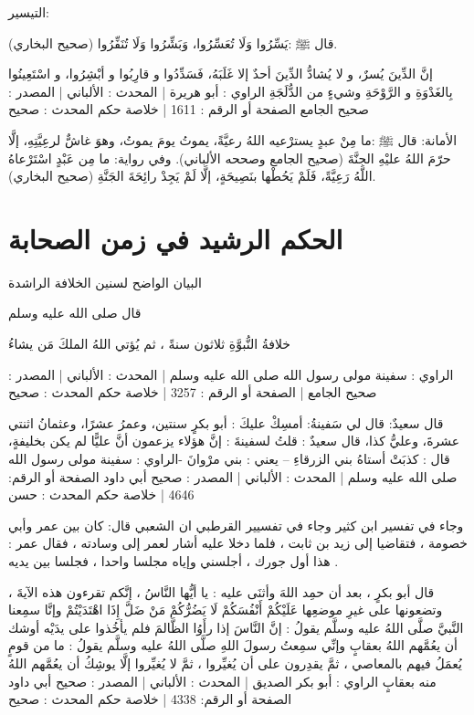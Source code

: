 التيسير:

قال ﷺ :يَسِّرُوا وَلَا تُعَسِّرُوا، وَبَشِّرُوا وَلَا تُنَفِّرُوا {\footnotesize (صحيح البخاري)}.

إنَّ الدِّينَ يُسرٌ، و لا يُشادُّ الدِّينَ أحدٌ إلا غَلَبَهُ، فَسَدِّدُوا و قارِبُوا و أبْشِرُوا، و اسْتَعِينُوا بِالغَدْوَةِ و الرَّوْحَةِ وشيءٍ من الدُّلَجَةِ
الراوي : أبو هريرة | المحدث : الألباني | المصدر : صحيح الجامع
الصفحة أو الرقم : 1611 | خلاصة حكم المحدث : صحيح 


الأمانة:
قال ﷺ :ما مِنْ عبدٍ يسترْعيه اللهُ رعيَّةً، يموتُ يومَ يموتُ، وهوَ غاشٌّ لرعِيَّتِهِ، إلَّا حرّمَ اللهُ عليْهِ الجنَّةَ {\footnotesize (صحيح الجامع وصححه الألباني)}. وفي رواية: ما مِن عَبْدٍ اسْتَرْعاهُ اللَّهُ رَعِيَّةً، فَلَمْ يَحُطْها بنَصِيحَةٍ، إلَّا لَمْ يَجِدْ رائِحَةَ الجَنَّةِ {\footnotesize (صحيح البخاري)}.



\section{الحكم الرشيد في زمن الصحابة}


البيان الواضح لسنين الخلافة الراشدة


قال صلى الله عليه وسلم 

خلافةُ النُّبوَّةِ ثلاثون سنةً ، ثم يُؤتي اللهُ الملكَ مَن يشاءُ

الراوي : سفينة مولى رسول الله صلى الله عليه وسلم | المحدث : الألباني | المصدر : صحيح الجامع | الصفحة أو الرقم : 3257 | خلاصة حكم المحدث : صحيح
   
قال سعيدٌ: قال لي سَفينةُ: أمسِكْ عليكَ : أبو بكرٍ سنتين، وعمرُ عشرًا، وعثمانُ اثنتي عشرةَ، وعليُّ كذا، قال سعيدٌ : قلتُ لسفينةَ : إنَّ هؤلاء يزعمون أنَّ عليًّا لم يكن بخليفةٍ، قال : كذبَتْ أستاهُ بني الزرقاءِ – يعني : بني مرْوانَ -الراوي : سفينة مولى رسول الله صلى الله عليه وسلم | المحدث : الألباني | المصدر : صحيح أبي داود
الصفحة أو الرقم: 4646 | خلاصة حكم المحدث : حسن

وجاء في تفسير ابن كثير 
وجاء في تفسيير القرطبي ان الشعبي قال: كان بين عمر وأبي خصومة ، فتقاضيا إلى زيد بن ثابت ، فلما دخلا عليه أشار لعمر إلى وسادته ، فقال عمر : هذا أول جورك ، أجلسني وإياه مجلسا واحدا ، فجلسا بين يديه .

قال أبو بكرٍ ، بعد أن حمِد اللهَ وأثنَى عليه : يا أيُّها النَّاسُ ، إنَّكم تقرءون هذه الآيةَ ، وتضعونها على غيرِ موضعِها عَلَيْكُمْ أَنْفُسَكُمْ لَا يَضُرُّكُمْ مَنْ ضَلَّ إِذَا اهْتَدَيْتُمْ وإنَّا سمِعنا النَّبيَّ صلَّى اللهُ عليه وسلَّم يقولُ : إنَّ النَّاسَ إذا رأَوُا الظَّالمَ فلم يأخُذوا على يدَيْه أوشك أن يعُمَّهم اللهُ بعقابٍ وإنِّي سمِعتُ رسولَ اللهِ صلَّى اللهُ عليه وسلَّم يقولُ : ما من قومٍ يُعمَلُ فيهم بالمعاصي ، ثمَّ يقدِرون على أن يُغيِّروا ، ثمَّ لا يُغيِّروا إلَّا يوشِكُ أن يعُمَّهم اللهُ منه بعقابٍ
الراوي : أبو بكر الصديق | المحدث : الألباني | المصدر : صحيح أبي داود
الصفحة أو الرقم: 4338 | خلاصة حكم المحدث : صحيح


